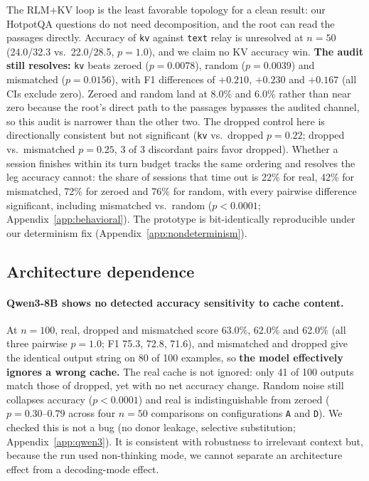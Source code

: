 \documentclass[11pt]{article}
\begin{document}
The RLM+KV loop is the least favorable topology for a clean result: our
HotpotQA questions do not need decomposition, and the root can read the
passages directly. Accuracy of \texttt{kv} against \texttt{text} relay is
unresolved at $n{=}50$ (24.0/32.3 vs.\ 22.0/28.5, $p=1.0$), and we claim
no KV accuracy win. \textbf{The audit still resolves:} \texttt{kv} beats zeroed
($p=0.0078$), random ($p=0.0039$) and mismatched ($p=0.0156$), with F1
differences of $+0.210$, $+0.230$ and $+0.167$ (all CIs exclude zero).
Zeroed and random land at 8.0\% and 6.0\% rather than near zero because
the root's direct path to the passages bypasses the audited channel, so
this audit is narrower than the other two. The dropped control here is
directionally consistent but not significant (\texttt{kv} vs.\ dropped
$p=0.22$; dropped vs.\ mismatched $p=0.25$, 3 of 3 discordant pairs favor
dropped). Whether a session finishes within its turn budget tracks the
same ordering and resolves the leg accuracy cannot: the share of sessions
that time out is 22\% for real, 42\% for mismatched, 72\% for zeroed and 76\%
for random, with every pairwise difference significant, including mismatched
vs.\ random ($p<0.0001$; Appendix~\ref{app:behavioral}). The prototype is
bit-identically reproducible under our determinism fix
(Appendix~\ref{app:nondeterminism}).

\subsection{Architecture dependence}

\paragraph{Qwen3-8B shows no detected accuracy sensitivity to cache content.}
At $n{=}100$, real, dropped and mismatched score 63.0\%, 62.0\% and 62.0\% (all
three pairwise $p=1.0$; F1 75.3, 72.8, 71.6), and mismatched and dropped give the
identical output string on 80 of 100 examples, so \textbf{the model effectively
ignores a wrong cache.} The real cache is not ignored: only 41 of 100 outputs match
those of dropped, yet with no net accuracy change. Random noise still collapses
accuracy ($p<0.0001$) and real is indistinguishable from zeroed
($p=0.30$--$0.79$ across four $n{=}50$ comparisons on configurations \texttt{A} and
\texttt{D}). We checked this is not a bug (no donor leakage, selective
substitution; Appendix~\ref{app:qwen3}).
It is consistent with robustness to irrelevant context but, because the
run used non-thinking mode, we cannot separate an architecture effect from
a decoding-mode effect.
\end{document}
